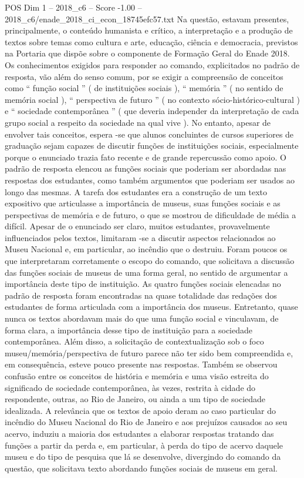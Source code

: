 \begin{textsample}{POS Dim 1 – 2018\_c6 – Score -1.00 – 2018\_c6/enade\_2018\_ci\_econ\_18745efc57.txt}
Na questão, estavam presentes, principalmente, o conteúdo humanista e crítico, a interpretação e a produção de textos sobre temas como cultura e arte, educação, ciência e democracia, previstos na Portaria que dispõe sobre o componente de Formação Geral do Enade 2018.
Os conhecimentos exigidos para responder ao comando, explicitados no padrão de resposta, vão além do senso comum, por se exigir a compreensão de conceitos como “ função social ” ( de instituições sociais ), “ memória ” ( no sentido de memória social ), “ perspectiva de futuro ” ( no contexto sócio-histórico-cultural ) e “ sociedade contemporânea ” ( que deveria independer da interpretação de cada grupo social a respeito da sociedade na qual vive ).
No entanto, apesar de envolver tais conceitos, espera -se que alunos concluintes de cursos superiores de graduação sejam capazes de discutir funções de instituições sociais, especialmente porque o enunciado trazia fato recente e de grande repercussão como apoio.
O padrão de resposta elencou as funções sociais que poderiam ser abordadas nas respostas dos estudantes, como também argumentos que poderiam ser usados ao longo das mesmas.
A tarefa dos estudantes era a construção de um texto expositivo que articulasse a importância de museus, suas funções sociais e as perspectivas de memória e de futuro, o que se mostrou de dificuldade de média a difícil.
Apesar de o enunciado ser claro, muitos estudantes, provavelmente influenciados pelos textos, limitaram -se a discutir aspectos relacionados ao Museu Nacional e, em particular, ao incêndio que o destruiu.
Foram poucos os que interpretaram corretamente o escopo do comando, que solicitava a discussão das funções sociais de museus de uma forma geral, no sentido de argumentar a importância deste tipo de instituição.
As quatro funções sociais elencadas no padrão de resposta foram encontradas na quase totalidade das redações dos estudantes de forma articulada com a importância dos museus.
Entretanto, quase nunca os textos abordavam mais do que uma função social e vinculavam, de forma clara, a importância desse tipo de instituição para a sociedade contemporânea.
Além disso, a solicitação de contextualização sob o foco museu/memória/perspectiva de futuro parece não ter sido bem compreendida e, em consequência, esteve pouco presente nas respostas.
Também se observou confusão entre os conceitos de história e memória e uma visão estreita do significado de sociedade contemporânea, às vezes, restrita à cidade do respondente, outras, ao Rio de Janeiro, ou ainda a um tipo de sociedade idealizada.
A relevância que os textos de apoio deram ao caso particular do incêndio do Museu Nacional do Rio de Janeiro e aos prejuízos causados ao seu acervo, induziu a maioria dos estudantes a elaborar respostas tratando das funções a partir da perda e, em particular, à perda do tipo de acervo daquele museu e do tipo de pesquisa que lá se desenvolve, divergindo do comando da questão, que solicitava texto abordando funções sociais de museus em geral.

\end{textsample}
